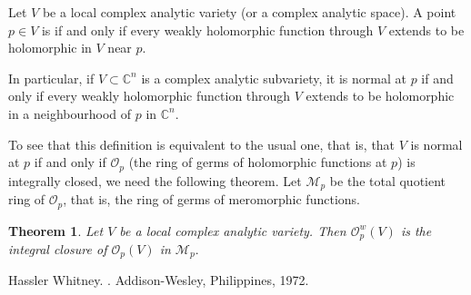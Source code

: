 \documentclass[12pt]{article}
\theoremstyle{theorem}
\newtheorem*{thm}{Theorem}
\theoremstyle{definition}
\theoremstyle{remark}
\begin{document}
Let $V$ be a local complex analytic variety (or a complex analytic space).  A point $p \in V$
is  if and only if every weakly holomorphic function through $V$ extends to be 
holomorphic in $V$ near $p.$

In particular, if $V \subset {\mathbb{C}}^n$ is a complex analytic subvariety, it is normal at $p$ if and only if every weakly holomorphic function through $V$ extends to be holomorphic in a neighbourhood of $p$ in ${\mathbb{C}}^n$.

To see that this definition is equivalent to the usual one, that is, that $V$ is normal
at $p$ if and only if ${\mathcal{O}}_p$ (the ring of germs of holomorphic functions at $p$)
is integrally closed, we need the following theorem.  Let ${\mathcal{M}}_p$ be the total quotient ring of ${\mathcal{O}}_p$, that is, the ring of germs of meromorphic functions.

\begin{thm}
Let $V$ be a local complex analytic variety.  Then ${\mathcal{O}}_p^w(V)$ is the integral
closure of ${\mathcal{O}}_p(V)$ in ${\mathcal{M}}_p.$
\end{thm}

\begin{thebibliography}{9}
Hassler Whitney.
{\em {}}.
Addison-Wesley, Philippines, 1972.
\end{thebibliography}
\end{document}

